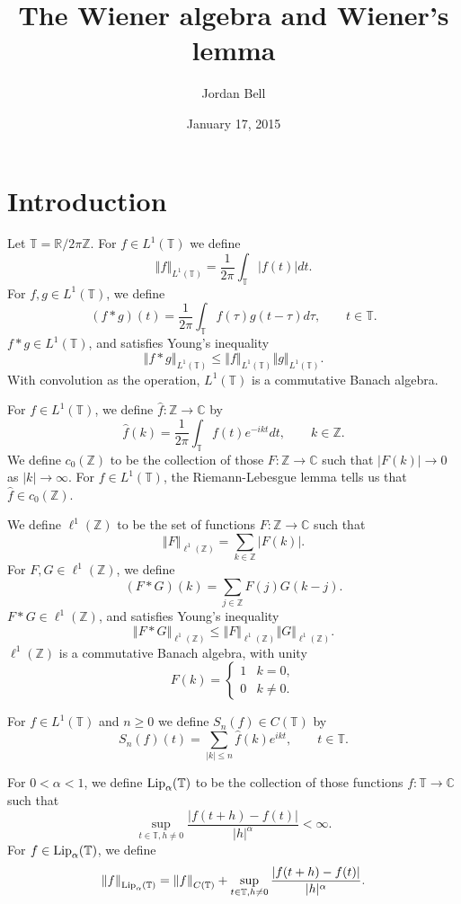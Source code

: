 \documentclass{article}
\newcommand{\Lip}{\ensuremath\mathrm{Lip}}
\newcommand{\norm}[1]{\left\Vert #1 \right\Vert}
\theoremstyle{definition}
\begin{document}
\title{The Wiener algebra and Wiener's lemma}
\author{Jordan Bell}
\date{January 17, 2015}

\maketitle

\section{Introduction}
Let $\mathbb{T}=\mathbb{R} / 2\pi \mathbb{Z}$.
For $f \in L^1(\mathbb{T})$ we define
\[
\norm{f}_{L^1(\mathbb{T})} = \frac{1}{2\pi} \int_\mathbb{T} |f(t)| dt.
\]
For $f,g \in L^1(\mathbb{T})$, we define
\[
(f*g)(t) = \frac{1}{2\pi} \int_{\mathbb{T}} f(\tau)g(t-\tau) d\tau, \qquad t \in \mathbb{T}.
\]
$f*g \in L^1(\mathbb{T})$, and  satisfies Young's inequality
\[
\norm{f*g}_{L^1(\mathbb{T})} \leq \norm{f}_{L^1(\mathbb{T})}
\norm{g}_{L^1(\mathbb{T})}.
\]
With convolution as the operation, $L^1(\mathbb{T})$ is a commutative Banach algebra.


For $f \in L^1(\mathbb{T})$, we define $\hat{f}:\mathbb{Z} \to \mathbb{C}$ by
\[
\hat{f}(k) = \frac{1}{2\pi} \int_{\mathbb{T}} f(t)  e^{-ikt} dt, \qquad k \in \mathbb{Z}.
\]
We define $c_0(\mathbb{Z})$ to be the collection of those $F:\mathbb{Z} \to \mathbb{C}$ such that
$|F(k)| \to 0$ as $|k| \to \infty$. For $f \in L^1(\mathbb{T})$, the Riemann-Lebesgue lemma tells us that
 $\hat{f} \in c_0(\mathbb{Z})$.

We define $\ell^1(\mathbb{Z})$ to be the set of functions $F:\mathbb{Z} \to \mathbb{C}$ such that
\[
\norm{F}_{\ell^1(\mathbb{Z})} = \sum_{k \in \mathbb{Z}} |F(k)|.
\]
For $F,G \in \ell^1(\mathbb{Z})$, we define
\[
(F*G)(k) = \sum_{j \in \mathbb{Z}} F(j)G(k-j).
\]
$F*G \in \ell^1(\mathbb{Z})$, and  satisfies Young's inequality
\[
\norm{F*G}_{\ell^1(\mathbb{Z})} \leq \norm{F}_{\ell^1(\mathbb{Z})}
\norm{G}_{\ell^1(\mathbb{Z})}.
\]
$\ell^1(\mathbb{Z})$ is a commutative Banach algebra, with unity
\[
F(k) = \begin{cases}
1&k=0,\\
0&k \neq 0.
\end{cases}
\]


For $f \in L^1(\mathbb{T})$ and $n \geq 0$ we define $S_n(f) \in C(\mathbb{T})$ by
\[
S_n(f)(t) = \sum_{|k| \leq n} \hat{f}(k) e^{ikt}, \qquad t \in \mathbb{T}.
\]

For $0<\alpha<1$, we define $\Lip_\alpha(\mathbb{T})$ to be the collection of those functions
$f:\mathbb{T} \to \mathbb{C}$ such that
\[
\sup_{t \in \mathbb{T}, h \neq 0} \frac{|f(t+h)-f(t)|}{|h|^\alpha}<\infty.
\] 
For $f \in \Lip_\alpha(\mathbb{T})$, we define
\[
\norm{f}_{\Lip_\alpha(\mathbb{T})} = \norm{f}_{C(\mathbb{T})}+
\sup_{t \in \mathbb{T}, h \neq 0} \frac{|f(t+h)-f(t)|}{|h|^\alpha}.
\]
\end{document}
